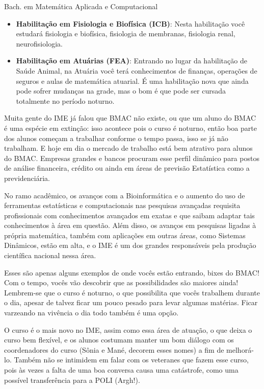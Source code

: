\begin{subsecao}{Bach. em Matemática Aplicada e Computacional}
\begin{itemize}
    pensou sobre toda a matemática que está por trás disso? As matérias são dadas na
    FSP (A Faculdade de Saúde Pública é vizinha da Medicina e fica ao lado do
    metrô Clínicas) e você terá aula com alunos não só do IME, mas também dos
    cursos que são oferecidos na unidade.
  \item \textbf{Habilitação em Fisiologia e Biofísica (ICB)}:
    Nesta habilitação você estudará fisiologia e biofísica, fisiologia de
    membranas, fisiologia renal, neurofisiologia.
  \item \textbf{Habilitação em Atuárias (FEA)}:
   Entrando no lugar da habilitação de Saúde Animal, na Atuária você terá 
   conhecimentos de finanças, operações de seguros e aulas de matemática atuarial. 
   É uma habilitação nova que ainda pode sofrer mudanças na grade, mas o bom é que 
   pode ser cursada totalmente no período noturno.
\end{itemize}

Muita gente do IME já falou que BMAC não existe, ou que um aluno do BMAC é uma
espécie em extinção: isso acontece pois o curso é noturno, então boa parte
dos alunos começam a trabalhar conforme o tempo passa, isso se já não trabalham.
E hoje em dia o mercado de trabalho está bem atrativo para alunos do BMAC.
Empresas grandes e bancos procuram esse perfil dinâmico para postos de análise
financeira, crédito ou ainda em áreas de previsão Estatística como a
previdenciária.

No ramo acadêmico, os avanços com a Bioinformática e o aumento do uso de
ferramentas estatísticas e computacionais nas pesquisas avançadas requisita
profissionais com conhecimentos avançados em exatas e que saibam adaptar tais
conhecimentos à área em questão. Além disso, os avanços em pesquisas ligadas à
própria matemática, também com aplicações em outras áreas, como Sistemas
Dinâmicos, estão em alta, e o IME é um dos grandes responsáveis pela produção
científica nacional nessa área.

Esses são apenas alguns exemplos de onde vocês estão entrando, bixes do BMAC! Com o tempo,
vocês vão descobrir que as possibilidades são maiores ainda! Lembrem-se que o
curso é noturno, o que possibilita que vocês trabalhem durante o dia, apesar de talvez
ficar um pouco pesado para levar algumas matérias. Ficar varzeando na vivência o dia todo
também é uma opção.

O curso é o mais novo no IME, assim como essa área de atuação, o que deixa o curso
bem flexível, e os alunos costumam manter um bom diálogo com os coordenadores do
curso (Sônia e Mané, decorem esses nomes) a fim de melhorá-lo. Também não se intimidem
em falar com os veteranes que fazem esse curso, pois às vezes a falta de uma boa conversa
causa uma catástrofe, como uma possível transferência para a POLI (Argh!).

\end{subsecao}
